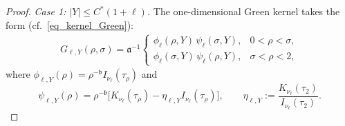 \documentclass[12pt]{amsart}
\begin{document}
\begin{proof}
\textit{Case 1: $|Y|\le C^*(1+\ell)$.} 
The one-dimensional Green kernel takes the form (cf.~\eqref{eq_kernel_Green}):
\begin{align}\label{eq_kernel_Green_copy}
G_{\ell,Y}(\rho,\sigma) = \mathfrak a^{-1}
\begin{cases}
\phi_{\ell}(\rho,Y)\,\psi_{\ell}(\sigma,Y), &0<\rho<\sigma,\\[4pt]
\phi_{\ell}(\sigma,Y)\,\psi_{\ell}(\rho,Y), &\sigma < \rho<2,
\end{cases}
\end{align}
where $\phi_{\ell,Y}(\rho) = \rho^{-\mathfrak b}I_{\nu_\ell}(\tau_\rho)$ and
\begin{equation*}
\psi_{\ell,Y}(\rho) = \rho^{-\mathfrak b} \bigl[ K_{\nu_\ell}(\tau_\rho) - \eta_{\ell,Y} I_{\nu_\ell}(\tau_\rho)\bigr],\qquad \eta_{\ell,Y} := \frac{K_{\nu_\ell}(\tau_2)}{I_{\nu_\ell}(\tau_2)}.
\end{equation*}



\end{proof}
\end{document}
